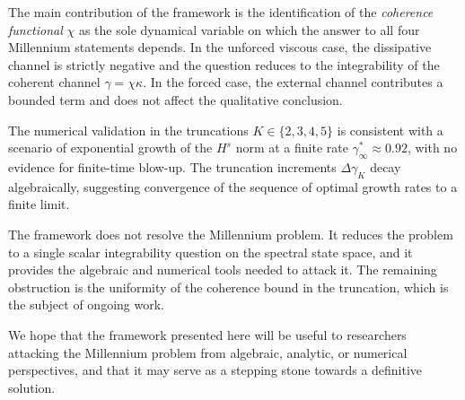 The main contribution of the framework is the identification of the 
\emph{coherence functional} $\chi$ as the sole dynamical variable on 
which the answer to all four Millennium statements depends. In the 
unforced viscous case, the dissipative channel is strictly negative 
and the question reduces to the integrability of the coherent 
channel $\gamma = \chi\kappa$. In the forced case, the external 
channel contributes a bounded term and does not affect the 
qualitative conclusion.

The numerical validation in the truncations $K\in\{2,3,4,5\}$ is 
consistent with a scenario of exponential growth of the $H^s$ norm 
at a finite rate $\gamma^\ast_\infty\approx0.92$, with no evidence 
for finite-time blow-up. The truncation increments $\Delta\gamma_K$ 
decay algebraically, suggesting convergence of the sequence of 
optimal growth rates to a finite limit.

The framework does not resolve the Millennium problem. It reduces 
the problem to a single scalar integrability question on the 
spectral state space, and it provides the algebraic and numerical 
tools needed to attack it. The remaining obstruction is the 
uniformity of the coherence bound in the truncation, which is the 
subject of ongoing work.

We hope that the framework presented here will be useful to 
researchers attacking the Millennium problem from algebraic, 
analytic, or numerical perspectives, and that it may serve as a 
stepping stone towards a definitive solution.

